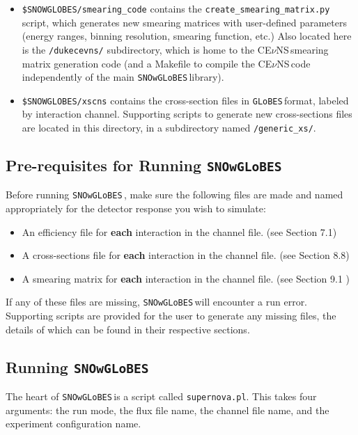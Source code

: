 \documentclass{article}
\newcommand{\cev}{CE$\nu$NS\,}
\newcommand{\snow}{\texttt{SNOwGLoBES}\,}
\newcommand{\glb}{\texttt{GLoBES}\,}
\begin{document}
\begin{itemize}
\item \texttt{\$SNOWGLOBES/smearing\_code} contains the \texttt{create\_smearing\_matrix.py} script, which generates new smearing matrices with user-defined parameters (energy ranges, binning resolution, smearing function, etc.) Also located here is the \texttt{/dukecevns/} subdirectory, which is home to the \cev smearing matrix generation code (and a Makefile to compile the \cev code independently of the main \snow library).

\item \texttt{\$SNOWGLOBES/xscns}  contains the cross-section files in \glb format, labeled by interaction channel. Supporting scripts to generate new cross-sections files are located in this directory, in a subdirectory named \texttt{/generic\_xs/}.

\end{itemize}
\subsection{Pre-requisites for Running \snow}

Before running \snow, make sure the following files are made and named appropriately for the detector response you wish to simulate: 
\begin{itemize}
    \item An efficiency file for \textbf{each} interaction in the channel file.  (see Section 7.1)
    \item A cross-sections file for \textbf{each} interaction in the channel file.  (see Section 8.8)
    \item A smearing matrix for \textbf{each} interaction in the channel file. (see Section 9.1 )
\end{itemize}

\noindent If any of these files are missing, \snow will encounter a run error. Supporting scripts are provided for the user to generate any missing files, the details of which can be found in their respective sections. 
\subsection{Running \snow}
The heart of \snow is a script called \texttt{supernova.pl}. This takes four arguments: the run mode, the flux file name, the channel file name, and the experiment configuration name.
\end{document}
